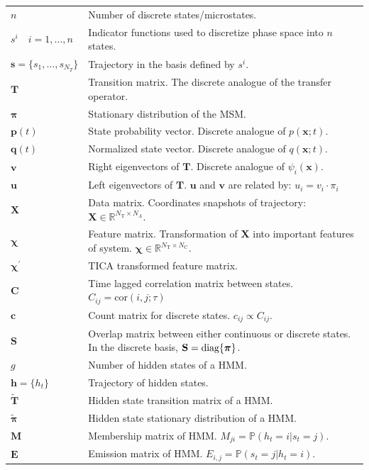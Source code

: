 \begin{table}
\begin{tabularx}{0.9\textwidth}{ |l| >{\raggedright\arraybackslash}X | }
        $n$ & Number of discrete states/microstates.\\
        $s^{i}\quad i = 1, \ldots, n$ & Indicator functions used to discretize phase space into $n$ states.  \\
        $\mathbf{s} = \{s_{1}, \ldots, s_{N_{T}}\} $ & Trajectory in the basis defined by $s^{i}$. \\
        $\mathbf{T}$ & Transition matrix. The discrete analogue of the transfer operator. \\
        $\bm{\pi}$ & Stationary distribution of the MSM. \\
        $\mathbf{p}(t)$ & State probability vector. Discrete analogue of $p(\mathbf{x}; t)$. \\
        $\mathbf{q}(t)$ & Normalized state vector. Discrete analogue of $q(\mathbf{x};t)$. \\
        $\mathbf{v}$ & Right eigenvectors of $\mathbf{T}$. Discrete analogue of $\psi_{i}(\mathbf{x})$. \\
        $\mathbf{u}$ & Left eigenvectors of $\mathbf{T}$. $\mathbf{u}$ and $\mathbf{v}$ are related by: $u_{i} = v_{i}\cdot\pi_{i}$ \\
        $\mathbf{X}$ & Data matrix.  Coordinates snapshots of trajectory: $\mathbf{X}\in \mathbb{R}^{N_{\mathrm{T}}\times N_{A}}$.\\
        $\bm{\chi}$ & Feature matrix. Transformation of $\mathbf{X}$ into important features of system. $\bm{\chi} \in \mathbb{R}^{N_{\mathrm{T}}\times N_{\mathrm{C}}}$. \\
        $\bm{\chi}^{\prime}$ & TICA transformed feature matrix. \\
        $\mathbf{C}$ & Time lagged correlation matrix between states. $C_{ij} = \mathrm{cor}(i, j; \tau)$  \\
        $\mathbf{c}$ & Count matrix for discrete states. $c_{ij} \propto C_{ij}$. \\
        $\mathbf{S}$ & Overlap matrix between  either continuous or discrete states. In the discrete basis, $\mathbf{S} = \textnormal{diag} \{\bm{\pi}\}$. \\
        $g$ & Number of hidden states of a HMM. \\
        $\mathbf{h} = \{h_t\}$ & Trajectory of hidden states. \\
        $\widetilde{\mathbf{T}}$ & Hidden state transition matrix of a HMM. \\
        $\widetilde{\bm{\pi}}$ & Hidden state stationary distribution of a HMM. \\
        $\mathbf{M}$ & Membership matrix of HMM. $M_{ji} = \mathbb{P}(h_t=i|s_t=j)$. \\
        $\mathbf{E}$ & Emission matrix of HMM. $E_{i, j}= \mathbb{P}(s_t=j|h_t=i)$. \\
     \hline
     \end{tabularx}
    \label{tab:theory_symbols}
\end{table}

